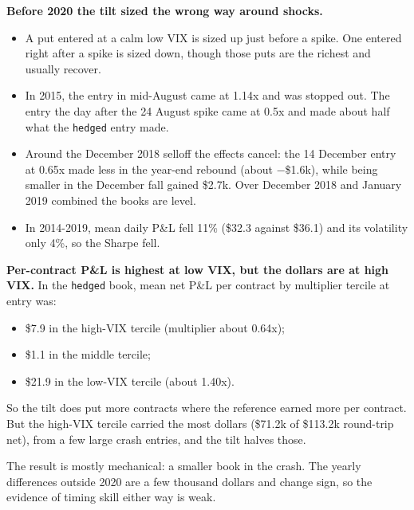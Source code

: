 \documentclass{article}
\begin{document}
\textbf{Before 2020 the tilt sized the wrong way around shocks.}

\begin{itemize}

\item A put entered at a calm low VIX is sized up just before a spike. One entered right after a spike is sized down, though those puts are the richest and usually recover.

\item In 2015, the entry in mid-August came at 1.14x and was stopped out. The entry the day after the 24 August spike came at 0.5x and made about half what the \texttt{hedged} entry made.

\item Around the December 2018 selloff the effects cancel: the 14 December entry at 0.65x made less in the year-end rebound (about \ensuremath{-}\$1.6k), while being smaller in the December fall gained \$2.7k. Over December 2018 and January 2019 combined the books are level.

\item In 2014-2019, mean daily P\&L fell 11\% (\$32.3 against \$36.1) and its volatility only 4\%, so the Sharpe fell.

\end{itemize}

\textbf{Per-contract P\&L is highest at low VIX, but the dollars are at high VIX.} In the \texttt{hedged} book, mean net P\&L per contract by multiplier tercile at entry was:

\begin{itemize}

\item \$7.9 in the high-VIX tercile (multiplier about 0.64x);

\item \$1.1 in the middle tercile;

\item \$21.9 in the low-VIX tercile (about 1.40x).

\end{itemize}

So the tilt does put more contracts where the reference earned more per contract. But the high-VIX tercile carried the most dollars (\$71.2k of \$113.2k round-trip net), from a few large crash entries, and the tilt halves those.

The result is mostly mechanical: a smaller book in the crash. The yearly differences outside 2020 are a few thousand dollars and change sign, so the evidence of timing skill either way is weak.
\end{document}
